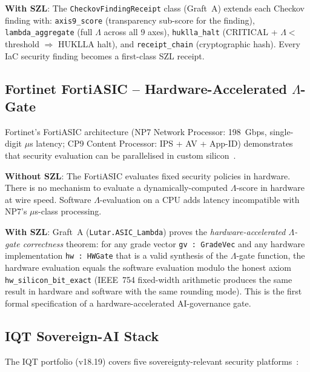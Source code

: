 \textbf{With SZL}: The \texttt{CheckovFindingReceipt} class (Graft~A)
extends each Checkov finding with: \texttt{axis9\_score} (transparency
sub-score for the finding), \texttt{lambda\_aggregate} (full $\Lambda$
across all 9 axes), \texttt{huklla\_halt} (CRITICAL + $\Lambda <$ threshold
$\Rightarrow$ HUKLLA halt), and \texttt{receipt\_chain} (cryptographic hash).
Every IaC security finding becomes a first-class SZL receipt.

\subsection{Fortinet FortiASIC -- Hardware-Accelerated $\Lambda$-Gate}
\label{ssec:fortinet}

Fortinet's FortiASIC architecture (NP7 Network Processor: 198~Gbps,
single-digit $\mu$s latency; CP9 Content Processor: IPS + AV + App-ID)
demonstrates that security evaluation can be parallelised in custom
silicon~\cite{szl_fortinet_graft}.

\textbf{Without SZL}: The FortiASIC evaluates fixed security policies in
hardware.  There is no mechanism to evaluate a dynamically-computed
$\Lambda$-score in hardware at wire speed.  Software $\Lambda$-evaluation
on a CPU adds latency incompatible with NP7's $\mu$s-class processing.

\textbf{With SZL}: Graft~A (\texttt{Lutar.ASIC\_Lambda}) proves the
\emph{hardware-accelerated $\Lambda$-gate correctness} theorem: for any
grade vector \texttt{gv : GradeVec} and any hardware implementation
\texttt{hw : HWGate} that is a valid synthesis of the $\Lambda$-gate
function, the hardware evaluation equals the software evaluation modulo
the honest axiom \texttt{hw\_silicon\_bit\_exact} (IEEE~754 fixed-width
arithmetic produces the same result in hardware and software with the same
rounding mode).  This is the first formal specification of a
hardware-accelerated AI-governance gate.

\subsection{IQT Sovereign-AI Stack}
\label{ssec:iqt-cyber}

The IQT portfolio (v18.19) covers five sovereignty-relevant security
platforms~\cite{szl_iqt_graft}:

